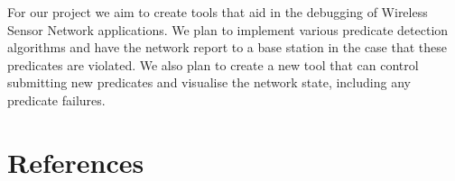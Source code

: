 \documentclass[a4paper]{article}
\begin{document}
For our project we aim to create tools that aid in the debugging of Wireless Sensor Network applications. We plan to implement various predicate detection algorithms and have the network report to a base station in the case that these predicates are violated. We also plan to create a new tool that can control submitting new predicates and visualise the network state, including any predicate failures.

\clearpage

\appendixpage
\addappheadtotoc
\appendix


\section{References}
\renewcommand{\refname}{\vspace{-1cm}}


\end{document}
